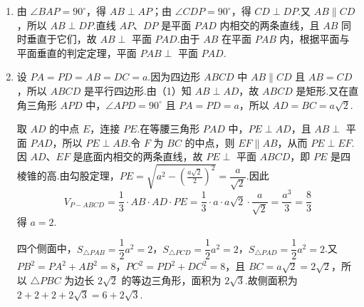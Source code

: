 \begin{solution}
\begin{enumerate}
\item 由 \(\angle BAP=90^\circ\)，得 \(AB\perp AP\)；由 \(\angle CDP=90^\circ\)，得 \(CD\perp DP\).又 \(AB\parallel CD\)，所以 \(AB\perp DP\).直线 \(AP\)、\(DP\) 是平面 \(PAD\) 内相交的两条直线，且 \(AB\) 同时垂直于它们，故 \(AB\perp\) 平面 \(PAD\).由于 \(AB\) 在平面 \(PAB\) 内，根据平面与平面垂直的判定定理，平面 \(PAB\perp\) 平面 \(PAD\).
\item 设 \(PA=PD=AB=DC=a\).因为四边形 \(ABCD\) 中 \(AB\parallel CD\) 且 \(AB=CD\)，所以 \(ABCD\) 是平行四边形.由（1）知 \(AB\perp AD\)，故 \(ABCD\) 是矩形.又在直角三角形 \(APD\) 中，\(\angle APD=90^\circ\) 且 \(PA=PD=a\)，所以 \(AD=BC=a\sqrt2\).

取 \(AD\) 的中点 \(E\)，连接 \(PE\).在等腰三角形 \(PAD\) 中，\(PE\perp AD\)，且 \(AB\perp\) 平面 \(PAD\)，所以 \(PE\perp AB\).令 \(F\) 为 \(BC\) 的中点，则 \(EF\parallel AB\)，从而 \(PE\perp EF\).因 \(AD\)、\(EF\) 是底面内相交的两条直线，故 \(PE\perp\) 平面 \(ABCD\)，即 \(PE\) 是四棱锥的高.由勾股定理，\(PE=\sqrt{a^2-(\frac{a\sqrt2}{2})^2}=\dfrac{a}{\sqrt2}\).因此
\[
V_{P-ABCD}=\frac13\cdot AB\cdot AD\cdot PE
=\frac13\cdot a\cdot a\sqrt2\cdot\frac{a}{\sqrt2}
=\frac{a^3}{3}=\frac83
\]
得 \(a=2\).

四个侧面中，\(S_{\triangle PAB}=\dfrac12a^2=2\)，\(S_{\triangle PCD}=\dfrac12a^2=2\)，\(S_{\triangle PAD}=\dfrac12a^2=2\).又 \(PB^2=PA^2+AB^2=8\)，\(PC^2=PD^2+DC^2=8\)，且 \(BC=a\sqrt2=2\sqrt2\)，所以 \(\triangle PBC\) 为边长 \(2\sqrt2\) 的等边三角形，面积为 \(2\sqrt3\).故侧面积为 \(2+2+2+2\sqrt3=6+2\sqrt3\).
\end{enumerate}
\end{solution}


